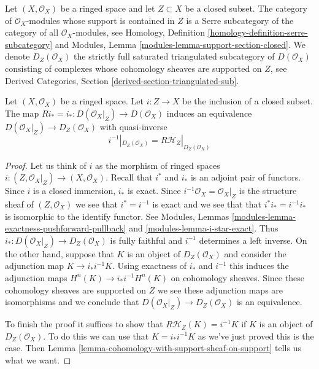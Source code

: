 \noindent
Let $(X, \mathcal{O}_X)$ be a ringed space and let $Z \subset X$
be a closed subset. The category of $\mathcal{O}_X$-modules whose
support is contained in $Z$ is a Serre subcategory of the
category of all $\mathcal{O}_X$-modules, see
Homology, Definition \ref{homology-definition-serre-subcategory}
and
Modules, Lemma \ref{modules-lemma-support-section-closed}.
We denote $D_Z(\mathcal{O}_X)$
the strictly full saturated triangulated subcategory of
$D(\mathcal{O}_X)$ consisting of complexes whose cohomology sheaves
are supported on $Z$, see
Derived Categories, Section \ref{derived-section-triangulated-sub}.

\begin{lemma}
\label{lemma-complexes-with-support-on-closed}
Let $(X, \mathcal{O}_X)$ be a ringed space. Let $i : Z \to X$ be the
inclusion of a closed subset. The map
$Ri_* = i_* : D(\mathcal{O}_X|_Z) \to D(\mathcal{O}_X)$
induces an equivalence
$D(\mathcal{O}_X|_Z) \to D_Z(\mathcal{O}_X)$ with quasi-inverse
$$
i^{-1}|_{D_Z(\mathcal{O}_X)} = R\mathcal{H}_Z|_{D_Z(\mathcal{O}_X)}
$$
\end{lemma}

\begin{proof}
Let us think of $i$ as the morphism of ringed spaces
$i : (Z, \mathcal{O}_X|_Z) \to (X, \mathcal{O}_X)$.
Recall that $i^*$ and $i_*$ is an adjoint pair of functors.
Since $i$ is a closed immersion, $i_*$ is exact.
Since $i^{-1}\mathcal{O}_X = \mathcal{O}_X|_Z$ is the structure
sheaf of $(Z, \mathcal{O}_X)$ we see that $i^* = i^{-1}$
is exact and we see that that $i^*i_* = i^{-1}i_*$
is isomorphic to the identify functor. See
Modules, Lemmas \ref{modules-lemma-exactness-pushforward-pullback} and
\ref{modules-lemma-i-star-exact}. Thus
$i_* : D(\mathcal{O}_X|_Z) \to D_Z(\mathcal{O}_X)$
is fully faithful and $i^{-1}$ determines
a left inverse. On the other hand, suppose that $K$ is an object of
$D_Z(\mathcal{O}_X)$ and consider the adjunction map
$K \to i_*i^{-1}K$.
Using exactness of $i_*$ and $i^{-1}$ this induces the adjunction maps
$H^n(K) \to i_*i^{-1}H^n(K)$ on cohomology sheaves. Since these cohomology
sheaves are supported on $Z$ we see these adjunction maps are isomorphisms
and we conclude that $D(\mathcal{O}_X|_Z) \to D_Z(\mathcal{O}_X)$
is an equivalence.

\medskip\noindent
To finish the proof it suffices to show that $R\mathcal{H}_Z(K) = i^{-1}K$ if
$K$ is an object of $D_Z(\mathcal{O}_X)$. To do this we can use that
$K = i_*i^{-1}K$ as we've just proved this is the case. Then
Lemma \ref{lemma-cohomology-with-support-sheaf-on-support}
tells us what we want.
\end{proof}

